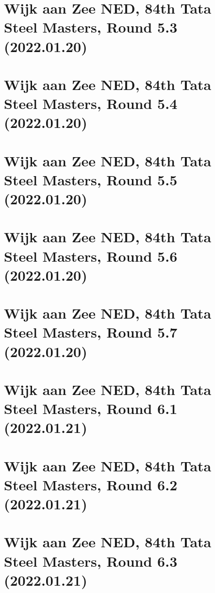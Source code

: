 \documentclass[11pt]{article}
\newcommand*\cleartoleftpage{%
   \clearpage
   \ifodd\value{page}\hbox{}\newpage\fi
}
\begin{document}
\cleartoleftpage

\section{Wijk aan Zee NED, 84th Tata Steel Masters, Round 5.3 (2022.01.20)}


\cleartoleftpage

\section{Wijk aan Zee NED, 84th Tata Steel Masters, Round 5.4 (2022.01.20)}


\cleartoleftpage

\section{Wijk aan Zee NED, 84th Tata Steel Masters, Round 5.5 (2022.01.20)}


\cleartoleftpage

\section{Wijk aan Zee NED, 84th Tata Steel Masters, Round 5.6 (2022.01.20)}


\cleartoleftpage

\section{Wijk aan Zee NED, 84th Tata Steel Masters, Round 5.7 (2022.01.20)}


\cleartoleftpage

\section{Wijk aan Zee NED, 84th Tata Steel Masters, Round 6.1 (2022.01.21)}


\cleartoleftpage

\section{Wijk aan Zee NED, 84th Tata Steel Masters, Round 6.2 (2022.01.21)}


\cleartoleftpage

\section{Wijk aan Zee NED, 84th Tata Steel Masters, Round 6.3 (2022.01.21)}

\end{document}
